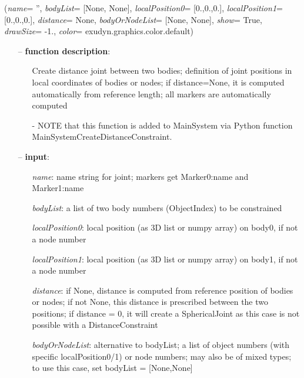 %
\begin{flushleft}
\label{sec:mainsystemextensions:CreateDistanceConstraint}
({\it name}= '', {\it bodyList}= [None, None], {\it localPosition0}= [0.,0.,0.], {\it localPosition1}= [0.,0.,0.], {\it distance}= None, {\it bodyOrNodeList}= [None, None], {\it show}= True, {\it drawSize}= -1., {\it color}= exudyn.graphics.color.default)
\end{flushleft}
\setlength{\itemindent}{0.7cm}
\begin{itemize}[leftmargin=0.7cm]
\item[--]
{\bf function description}: \vspace{-6pt}
\begin{itemize}[leftmargin=1.2cm]
\setlength{\itemindent}{-0.7cm}
\item[]Create distance joint between two bodies; definition of joint positions in local coordinates of bodies or nodes; if distance=None, it is computed automatically from reference length; all markers are automatically computed
\item[]- NOTE that this function is added to MainSystem via Python function MainSystemCreateDistanceConstraint.
\end{itemize}
\item[--]
{\bf input}: \vspace{-6pt}
\begin{itemize}[leftmargin=1.2cm]
\setlength{\itemindent}{-0.7cm}
\item[]{\it name}: name string for joint; markers get Marker0:name and Marker1:name
\item[]{\it bodyList}: a list of two body numbers (ObjectIndex) to be constrained
\item[]{\it localPosition0}: local position (as 3D list or numpy array) on body0, if not a node number
\item[]{\it localPosition1}: local position (as 3D list or numpy array) on body1, if not a node number
\item[]{\it distance}: if None, distance is computed from reference position of bodies or nodes; if not None, this distance is prescribed between the two positions; if distance = 0, it will create a SphericalJoint as this case is not possible with a DistanceConstraint
\item[]{\it bodyOrNodeList}: alternative to bodyList; a list of object numbers (with specific localPosition0/1) or node numbers; may also be of mixed types; to use this case, set bodyList = [None,None]

\end{itemize}
\end{itemize}
